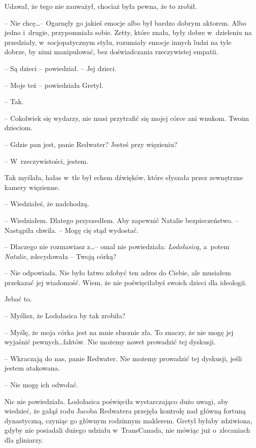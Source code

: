 \documentclass[oneside,polish,11pt,sfheadings]{mwbk}
\begin{document}
Udawał, że tego nie zauważył, chociaż była pewna, że to zrobił. 

-- Nie chcę\ldots  -- Ogarnęły go jakieś emocje albo był bardzo dobrym aktorem. Albo
jedno i~drugie, przypomniała sobie. Zetty, które znała, były dobre w~dzieleniu na przedziały, w~socjopatycznym stylu, rozumiały emocje innych
ludzi na tyle dobrze, by nimi manipulować, bez doświadczania
rzeczywistej empatii. 

-- Są dzieci -- powiedział. -- Jej dzieci.

-- Moje też -- powiedziała Gretyl.

-- Tak.

-- Cokolwiek się wydarzy, nie musi przytrafić się mojej córce ani wnukom.
Twoim dzieciom.

-- Gdzie pan jest, panie Redwater? Jesteś przy więzieniu?

-- W~rzeczywistości, jestem.

Tak myślała, hałas w~tle był echem dźwięków, które słyszała przez
zewnętrzne kamery więzienne.

-- Wiedziałeś, że nadchodzą.

-- Wiedziałem. Dlatego przyszedłem. Aby zapewnić Natalie bezpieczeństwo.
-- Nastąpiła chwila. -- Mogę cię stąd wydostać.

-- Dlaczego nie rozmawiasz z\ldots  -- omal nie powiedziała:
\textit{Lodołasicą}, a~potem \textit{Natalie}, zdecydowała -- Twoją córką?

-- Nie odpowiada. Nie było łatwo zdobyć ten adres do Ciebie, ale musiałem
przekazać jej wiadomość. Wiem, że nie poświęciłabyś swoich dzieci dla
ideologii.

Jebać to. 

-- Myślisz, że Lodołasica by tak zrobiła?

-- Myślę, że moja córka jest na mnie słusznie zła. To znaczy, że nie mogę
jej wyjaśnić pewnych\ldots  faktów. Nie możemy nawet prowadzić tej dyskusji.

-- Wkraczają do nas, panie Redwater. Nie możemy prowadzić tej dyskusji,
jeśli jestem atakowana.

-- Nie mogę ich odwołać.

Nic nie powiedziała. Lodołasica poświęciła wystarczająco dużo uwagi, aby
wiedzieć, że gałąź rodu Jacoba Redwatera przejęła kontrolę nad główną
fortuną dynastyczną, czyniąc go głównym rodzinnym maklerem. Gretyl
byłaby zdziwiona, gdyby nie posiadali dużego udziału w~TransCanada, nie
mówiąc już o~zlecaniach dla gliniarzy.
\end{document}
